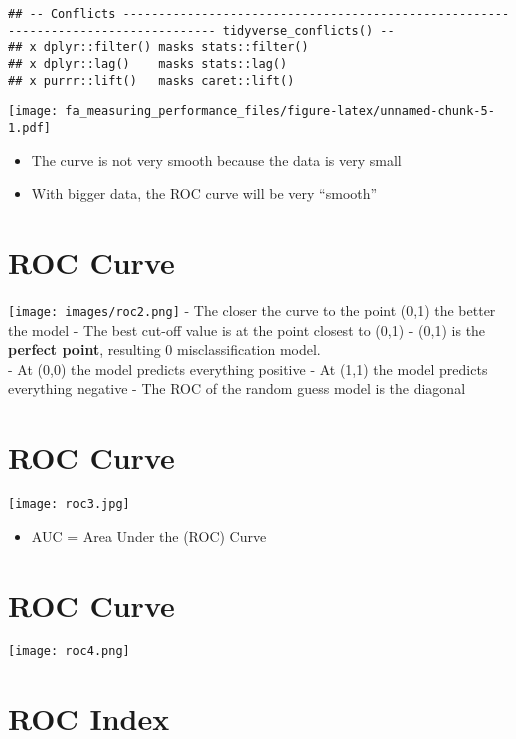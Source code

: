 \documentclass[
]{article}
\providecommand{\tightlist}{%
  \setlength{\itemsep}{0pt}\setlength{\parskip}{0pt}}
\begin{document}
\begin{verbatim}
## -- Conflicts ----------------------------------------------------------------------------------- tidyverse_conflicts() --
## x dplyr::filter() masks stats::filter()
## x dplyr::lag()    masks stats::lag()
## x purrr::lift()   masks caret::lift()
\end{verbatim}

\texttt{[image: fa\_measuring\_performance\_files/figure-latex/unnamed-chunk-5-1.pdf]}

\begin{itemize}
\tightlist
\item
  The curve is not very smooth because the data is very small
\item
  With bigger data, the ROC curve will be very ``smooth''
\end{itemize}

\hypertarget{roc-curve-2}{%
\section{ROC Curve}\label{roc-curve-2}}

\texttt{[image: images/roc2.png]} - The closer the curve to the point
(0,1) the better the model - The best cut-off value is at the point
closest to (0,1) - (0,1) is the \textbf{perfect point}, resulting 0
misclassification model.\\
- At (0,0) the model predicts everything positive - At (1,1) the model
predicts everything negative - The ROC of the random guess model is the
diagonal

\hypertarget{roc-curve-3}{%
\section{ROC Curve}\label{roc-curve-3}}

\texttt{[image: roc3.jpg]}

\begin{itemize}
\tightlist
\item
  AUC = Area Under the (ROC) Curve
\end{itemize}

\hypertarget{roc-curve-4}{%
\section{ROC Curve}\label{roc-curve-4}}

\texttt{[image: roc4.png]}

\hypertarget{roc-index}{%
\section{ROC Index}\label{roc-index}}
\end{document}
